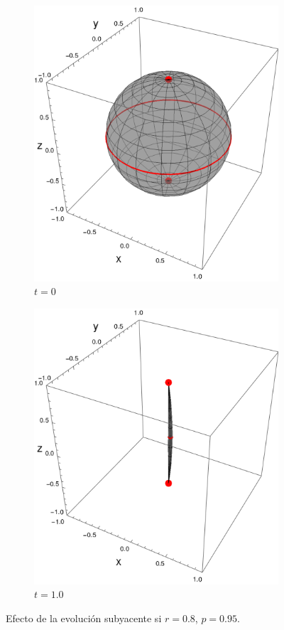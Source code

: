   \begin{figure}[h!]
    \centering
    \begin{subfigure}{0.45\textwidth}
      \centering
      \includegraphics[width=0.9\linewidth]{maxent/figures/sphere_CNOT_t=0.0_z=0.8_p=0.95.png}
      \caption{$t=0$}
    \end{subfigure}%
    \begin{subfigure}{0.45\textwidth}
      \centering
      \includegraphics[width=0.9\linewidth]{maxent/figures/sphere_CNOT_t=1.0_z=0.8_p=0.95.png}
      \caption{$t=1.0$}
    \end{subfigure}
    \caption{Efecto de la evolución subyacente si $r=0.8$, $p=0.95$.}
    \label{fig:CNOTsequence2}
\end{figure}


